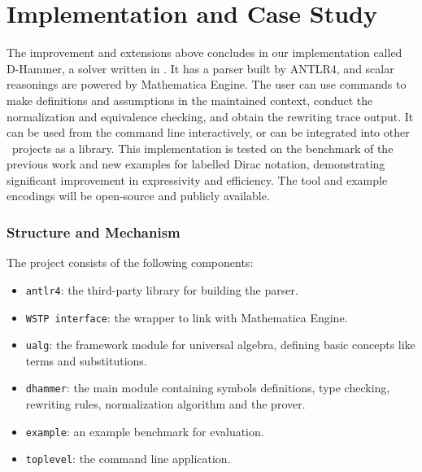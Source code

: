 
\section{Implementation and Case Study}
The improvement and extensions above concludes in our implementation called D-Hammer, a solver written in \CC. It has a parser built by ANTLR4, and scalar reasonings are powered by Mathematica Engine. The user can use commands to make definitions and assumptions in the maintained context, conduct the normalization and equivalence checking, and obtain the rewriting trace output. 
It can be used from the command line interactively, or can be integrated into other \CC\ projects as a library.
This implementation is tested on the benchmark of the previous work and new examples for labelled Dirac notation, demonstrating significant improvement in expressivity and efficiency. 
The tool and example encodings will be open-source and publicly available.

\subsubsection{Structure and Mechanism} 
The project consists of the following components:
\begin{itemize}
    \item \texttt{antlr4}: the third-party library for building the parser.
    \item \texttt{WSTP interface}: the wrapper to link with Mathematica Engine.
    \item \texttt{ualg}: the framework module for universal algebra, defining basic concepts like terms and substitutions.
    \item \texttt{dhammer}: the main module containing symbols definitions, type checking, rewriting rules, normalization algorithm and the prover.
    \item \texttt{example}: an example benchmark for evaluation.
    \item \texttt{toplevel}: the command line application.
\end{itemize}

% 

